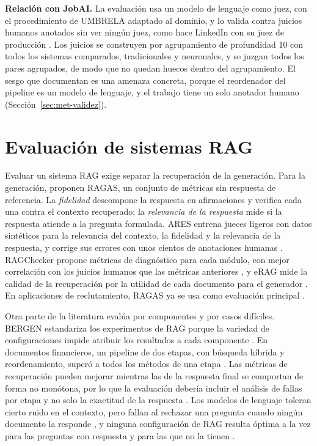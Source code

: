 \textbf{Relación con JobAI.} La evaluación usa un modelo de lenguaje como juez, con el procedimiento de UMBRELA adaptado al dominio, y lo valida contra juicios humanos anotados sin ver ningún juez, como hace LinkedIn con su juez de producción \citep{Borisyuk2026}. Los juicios se construyen por agrupamiento de profundidad 10 con todos los sistemas comparados, tradicionales y neuronales, y se juzgan todos los pares agrupados, de modo que no quedan huecos dentro del agrupamiento. El sesgo que documentan \citet{Frobe2025} es una amenaza concreta, porque el reordenador del pipeline es un modelo de lenguaje, y el trabajo tiene un solo anotador humano (Sección~\ref{sec:met-validez}).

\section{Evaluación de sistemas RAG}
\label{sec:estado-arte-evaluacion}

Evaluar un sistema RAG exige separar la recuperación de la generación. Para la generación, \citet{Es2024} proponen RAGAS, un conjunto de métricas sin respuesta de referencia. La \emph{fidelidad} descompone la respuesta en afirmaciones y verifica cada una contra el contexto recuperado; la \emph{relevancia de la respuesta} mide si la respuesta atiende a la pregunta formulada. ARES entrena jueces ligeros con datos sintéticos para la relevancia del contexto, la fidelidad y la relevancia de la respuesta, y corrige sus errores con unos cientos de anotaciones humanas \citep{SaadFalcon2024}. RAGChecker propone métricas de diagnóstico para cada módulo, con mejor correlación con los juicios humanos que las métricas anteriores \citep{Ru2024RAGChecker}, y eRAG mide la calidad de la recuperación por la utilidad de cada documento para el generador \citep{Salemi2024eRAG}. En aplicaciones de reclutamiento, RAGAS ya se usa como evaluación principal \citep{Tran2025}.

Otra parte de la literatura evalúa por componentes y por casos difíciles. BERGEN estandariza los experimentos de RAG porque la variedad de configuraciones impide atribuir los resultados a cada componente \citep{Rau2024BERGEN}. En documentos financieros, un pipeline de dos etapas, con búsqueda híbrida y reordenamiento, superó a todos los métodos de una etapa \citep{Akarsu2026}. Las métricas de recuperación pueden mejorar mientras las de la respuesta final se comportan de forma no monótona, por lo que la evaluación debería incluir el análisis de fallas por etapa y no solo la exactitud de la respuesta \citep{Muthyam2026}. Los modelos de lenguaje toleran cierto ruido en el contexto, pero fallan al rechazar una pregunta cuando ningún documento la responde \citep{Chen2024RGB}, y ninguna configuración de RAG resulta óptima a la vez para las preguntas con respuesta y para las que no la tienen \citep{Peng2025}.


